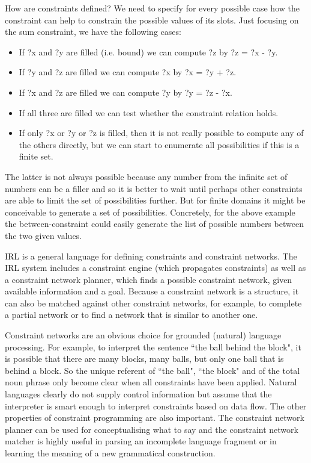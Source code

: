 How are constraints defined? We need to specify for every possible case how the constraint can help to 
constrain the possible values of its slots. 
Just focusing on the sum constraint, we have the following cases:
\begin{itemize}
\item If ?x and ?y are filled (i.e. bound) 
we can compute ?z by ?z = ?x - ?y. 
\item If ?y and ?z are filled we can compute ?x by ?x = ?y + ?z. 
\item If ?x and ?z are filled we can compute ?y by ?y = ?z - ?x. 
\item If all three are filled we can test whether the constraint relation holds. 
\item If only ?x or ?y or ?z is filled, then it is not really possible to compute any of the others directly, but we can start 
to enumerate all possibilities if this is a finite set. 
\end{itemize}
The latter is not always possible because any number from the infinite set of numbers can be a filler 
and so it is better to wait until 
perhaps other constraints are able to limit the set of possibilities further. But for finite domains 
it might be conceivable to generate a set of possibilities. Concretely, for the above example  
the between-constraint could easily generate the list of possible numbers between the two given values.

IRL is a general language for defining constraints and constraint networks. The IRL system includes a 
constraint engine (which propagates constraints) as well as a constraint network planner, which finds a possible 
constraint network, given available information and a goal. Because a constraint network is a structure, it 
can also be matched against other constraint networks, for example, to complete a partial network or to find a network 
that is similar to another one. 

Constraint networks are an obvious choice for grounded (natural) language processing. 
For example, to interpret the sentence ``the ball behind
the block", it is possible that there are many blocks, many balls, but only one ball that is behind a block. So the 
unique referent of ``the ball", ``the block" and of the total noun phrase only become clear when 
all constraints have been applied. Natural languages clearly do not supply control information but assume that 
the interpreter is smart enough to interpret constraints based on data flow. The other properties of constraint 
programming are also important. The constraint network planner can be used for conceptualising what to say and 
the constraint network matcher is highly useful in parsing an incomplete language fragment or in learning the 
meaning of a new grammatical construction. \\

